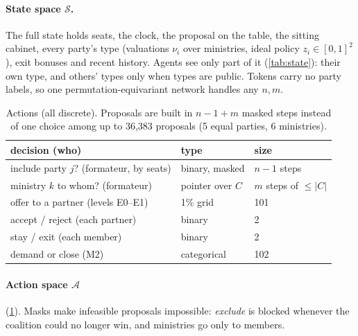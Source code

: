 \documentclass[10pt,twocolumn,a4paper]{article}
\begin{document}
\paragraph{State space $\mathcal S$.} The full state holds seats, the clock, the proposal on the table,
the sitting cabinet, every party's type (valuations $\nu_i$ over ministries, ideal policy $z_i\in[0,1]^2$),
exit bonuses and recent history. Agents see only part of it (\cref{tab:state}): their own type, and others'
types only when types are public. Tokens carry no party labels, so one permutation-equivariant network
handles any $n,m$.

\begin{table}[t]\centering\scriptsize\setlength{\tabcolsep}{2.5pt}
\caption{Actions (all discrete). Proposals are built in $n{-}1{+}m$ masked steps instead of one choice
among up to 36{,}383 proposals (5 equal parties, 6 ministries).}\label{tab:action}
\begin{tabular}{@{}l l l@{}}\toprule
decision (who) & type & size \\\midrule
include party $j$? (formateur, by seats) & binary, masked & $n{-}1$ steps \\
ministry $k$ to whom? (formateur) & pointer over $C$ & $m$ steps of $\le|C|$ \\
offer to a partner (levels E0--E1) & 1\% grid & 101 \\
accept / reject (each partner) & binary & 2 \\
stay / exit (each member) & binary & 2 \\
demand or close (M2) & categorical & 102 \\\bottomrule
\end{tabular}\end{table}

\paragraph{Action space $\mathcal A$} (\cref{tab:action}). Masks make infeasible proposals impossible:
\emph{exclude} is blocked whenever the coalition could no longer win, and ministries go only to members.
\end{document}
